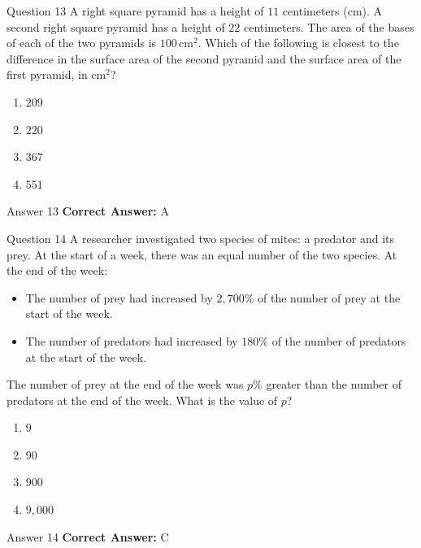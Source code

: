 \documentclass{beamer}
\begin{document}
\begin{frame}{Question 13}
\small
A right square pyramid has a height of \(11\) centimeters (cm). A second right square pyramid has a height of \(22\) centimeters. The area of the bases of each of the two pyramids is \(100\,\text{cm}^{2}\).
Which of the following is closest to the difference in the surface area of the second pyramid and the surface area of the first pyramid, in \(\text{cm}^{2}\)?
\vspace{0.35cm}
\begin{enumerate}
    \item[A.] \(209\)
    \item[B.] \(220\)
    \item[C.] \(367\)
    \item[D.] \(551\)
\end{enumerate}
\end{frame}
\begin{frame}{Answer 13}
\small
\textbf{Correct Answer:} A
\end{frame}

\begin{frame}{Question 14}
\small
A researcher investigated two species of mites: a predator and its prey. At the start of a week, there was an equal number of the two species. At the end of the week:
\begin{itemize}
\item The number of prey had increased by \(2{,}700\%\) of the number of prey at the start of the week.
\item The number of predators had increased by \(180\%\) of the number of predators at the start of the week.
\end{itemize}
The number of prey at the end of the week was \(p\%\) greater than the number of predators at the end of the week. What is the value of \(p\)?
\vspace{0.35cm}
\begin{enumerate}
    \item[A.] \(9\)
    \item[B.] \(90\)
    \item[C.] \(900\)
    \item[D.] \(9{,}000\)
\end{enumerate}
\end{frame}
\begin{frame}{Answer 14}
\small
\textbf{Correct Answer:} C
\end{frame}
\end{document}
